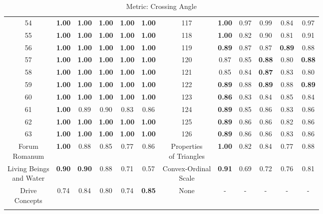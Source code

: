 \documentclass{article}
\begin{document}
{\begin{longtable}{cccccc@{\qquad}cccccc}
54 & \textbf{1.00} & \textbf{1.00} & \textbf{1.00} & \textbf{1.00} & \textbf{1.00} & 117 & \textbf{1.00} & 0.97 & 0.99 & 0.84 & 0.97 \\
55 & \textbf{1.00} & \textbf{1.00} & \textbf{1.00} & \textbf{1.00} & \textbf{1.00} & 118 & \textbf{1.00} & 0.82 & 0.90 & 0.81 & 0.91 \\
56 & \textbf{1.00} & \textbf{1.00} & \textbf{1.00} & \textbf{1.00} & \textbf{1.00} & 119 & \textbf{0.89} & 0.87 & 0.87 & \textbf{0.89} & 0.88 \\
57 & \textbf{1.00} & \textbf{1.00} & \textbf{1.00} & \textbf{1.00} & \textbf{1.00} & 120 & 0.87 & 0.85 & \textbf{0.88} & 0.80 & \textbf{0.88} \\
58 & \textbf{1.00} & \textbf{1.00} & \textbf{1.00} & \textbf{1.00} & \textbf{1.00} & 121 & 0.85 & 0.84 & \textbf{0.87} & 0.83 & 0.80 \\
59 & \textbf{1.00} & \textbf{1.00} & \textbf{1.00} & \textbf{1.00} & \textbf{1.00} & 122 & \textbf{0.89} & 0.88 & \textbf{0.89} & 0.88 & \textbf{0.89} \\
60 & \textbf{1.00} & \textbf{1.00} & \textbf{1.00} & \textbf{1.00} & \textbf{1.00} & 123 & \textbf{0.86} & 0.83 & 0.84 & 0.85 & 0.84 \\
61 & \textbf{1.00} & 0.89 & 0.90 & 0.83 & 0.86 & 124 & \textbf{0.89} & 0.85 & 0.86 & 0.83 & 0.86 \\
62 & \textbf{1.00} & \textbf{1.00} & \textbf{1.00} & \textbf{1.00} & \textbf{1.00} & 125 & \textbf{0.89} & 0.86 & 0.86 & 0.82 & 0.86 \\
63 & \textbf{1.00} & \textbf{1.00} & \textbf{1.00} & \textbf{1.00} & \textbf{1.00} & 126 & \textbf{0.89} & 0.86 & 0.86 & 0.83 & 0.86 \\
\makecell[c]{Forum \\ Romanum} & \textbf{1.00} & 0.88 & 0.85 & 0.77 & 0.86 & \makecell[c]{Properties \\ of Triangles} & \textbf{1.00} & 0.82 & 0.84 & 0.77 & 0.88 \\
\makecell[c]{Living Beings \\ and Water} & \textbf{0.90} & \textbf{0.90} & 0.88 & 0.71 & 0.57 & \makecell[c]{Convex-Ordinal \\ Scale} & \textbf{0.91} & 0.69 & 0.72 & 0.76 & 0.81 \\
\makecell[c]{Drive \\ Concepts} & 0.74 & 0.84 & 0.80 & 0.74 & \textbf{0.85} & None & - & - & - & - & - \\
\caption{Metric: Crossing Angle} \\
\end{longtable}
}
\clearpage
\end{document}
